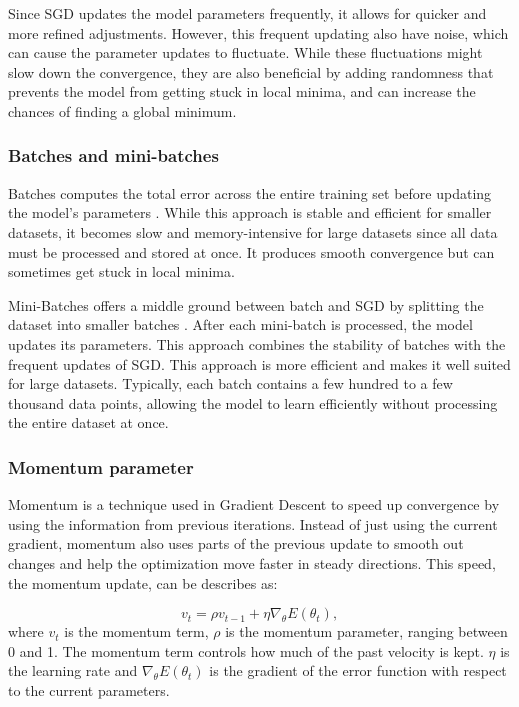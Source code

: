 \documentclass{article}
\newcommand{\0}{\mathbf{0}}
\newcommand{\1}{\mathbf{1}}
\begin{document}
Since SGD updates the model parameters frequently, it allows for quicker and more refined adjustments. However, this frequent updating also have noise, which can cause the parameter updates to fluctuate. While these fluctuations might slow down the convergence, they are also beneficial by adding randomness that prevents the model from getting stuck in local minima, and can increase the chances of finding a global minimum.










\subsubsection{Batches and mini-batches}

Batches computes the total error across the entire training set before updating the model's parameters \cite{ibm_gradient_descent}. While this approach is stable and efficient for smaller datasets, it becomes slow and memory-intensive for large datasets since all data must be processed and stored at once. It produces smooth convergence but can sometimes get stuck in local minima.


Mini-Batches offers a middle ground between batch and SGD by splitting the dataset into smaller batches \cite{ibm_gradient_descent}. After each mini-batch is processed, the model updates its parameters. This approach combines the stability of batches with the frequent updates of SGD. This approach is more efficient and makes it well suited for large datasets. Typically, each batch contains a few hundred to a few thousand data points, allowing the model to learn efficiently without processing the entire dataset at once.


\subsubsection{Momentum parameter}

Momentum is a technique used in Gradient Descent to speed up convergence by using the information from previous iterations. Instead of just using the current gradient, momentum also uses parts of the previous update to smooth out changes and help the optimization move faster in steady directions. This speed, the momentum update, can be describes as:

\begin{equation}
    v_t = \rho v_{t-1} + \eta \nabla_\theta E(\theta_t),
\end{equation}
where \( v_t \) is the momentum term, \( \rho \) is the momentum parameter, ranging between 0 and 1. The momentum term controls how much of the past velocity is kept. \( \eta \) is the learning rate and \( \nabla_\theta E(\theta_t) \) is the gradient of the error function with respect to the current parameters.
\end{document}
